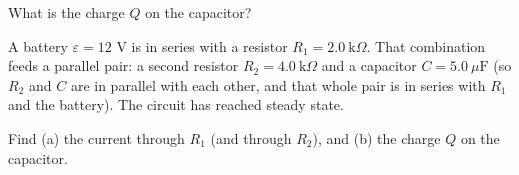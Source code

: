\documentclass[12pt]{article}
\begin{document}
\noindent What is the charge $Q$ on the capacitor?


\prob A battery $\varepsilon = 12$ V is in series with a resistor
$R_1 = 2.0\ \text{k}\Omega$. That combination feeds a parallel pair: a
second resistor $R_2 = 4.0\ \text{k}\Omega$ and a capacitor
$C = 5.0\ \mu\text{F}$ (so $R_2$ and $C$ are in parallel with each other,
and that whole pair is in series with $R_1$ and the battery). The circuit
has reached steady state.

\noindent Find (a) the current through $R_1$ (and through $R_2$), and
(b) the charge $Q$ on the capacitor.


\begin{answerkey}



\end{answerkey}
\end{document}
